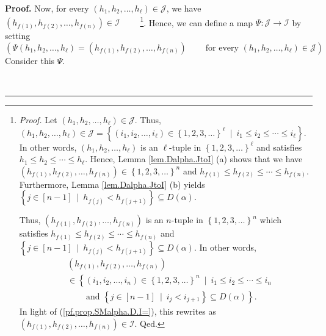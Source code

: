 \documentclass[numbers=enddot,12pt,final,onecolumn,notitlepage,abstracton]{scrartcl}
\theoremstyle{definition}
\newenvironment{proof}[1][Proof]{\noindent\textbf{#1.} }{\ \rule{0.5em}{0.5em}}
\newenvironment{verlong}{}{}
\begin{document}
\begin{verlong}
\begin{footnotesize}
\begin{proof}
Now, for every $\left(  h_{1},h_{2},\ldots,h_{\ell}\right)  \in\mathcal{J}$,
we have $\left(  h_{f\left(  1\right)  },h_{f\left(  2\right)  }%
,\ldots,h_{f\left(  n\right)  }\right)  \in\mathcal{I}$%
\ \ \ \ \footnote{\textit{Proof.} Let $\left(  h_{1},h_{2},\ldots,h_{\ell
}\right)  \in\mathcal{J}$. Thus, $\left(  h_{1},h_{2},\ldots,h_{\ell}\right)
\in\mathcal{J}=\left\{  \left(  i_{1},i_{2},\ldots,i_{\ell}\right)
\in\left\{  1,2,3,\ldots\right\}  ^{\ell}\ \mid\ i_{1}\leq i_{2}\leq\cdots\leq
i_{\ell}\right\}  $. In other words, $\left(  h_{1},h_{2},\ldots,h_{\ell
}\right)  $ is an $\ell$-tuple in $\left\{  1,2,3,\ldots\right\}  ^{\ell}$ and
satisfies $h_{1}\leq h_{2}\leq\cdots\leq h_{\ell}$. Hence, Lemma
\ref{lem.Dalpha.JtoI} (a) shows that we have $\left(  h_{f\left(  1\right)
},h_{f\left(  2\right)  },\ldots,h_{f\left(  n\right)  }\right)  \in\left\{
1,2,3,\ldots\right\}  ^{n}$ and $h_{f\left(  1\right)  }\leq h_{f\left(
2\right)  }\leq\cdots\leq h_{f\left(  n\right)  }$. Furthermore, Lemma
\ref{lem.Dalpha.JtoI} (b) yields $\left\{  j\in\left[  n-1\right]
\ \mid\ h_{f\left(  j\right)  }<h_{f\left(  j+1\right)  }\right\}  \subseteq
D\left(  \alpha\right)  $.
\par
Thus, $\left(  h_{f\left(  1\right)  },h_{f\left(  2\right)  },\ldots
,h_{f\left(  n\right)  }\right)  $ is an $n$-tuple in $\left\{  1,2,3,\ldots
\right\}  ^{n}$ which satisfies $h_{f\left(  1\right)  }\leq h_{f\left(
2\right)  }\leq\cdots\leq h_{f\left(  n\right)  }$ and $\left\{  j\in\left[
n-1\right]  \ \mid\ h_{f\left(  j\right)  }<h_{f\left(  j+1\right)  }\right\}
\subseteq D\left(  \alpha\right)  $. In other words,%
\begin{align*}
&  \left(  h_{f\left(  1\right)  },h_{f\left(  2\right)  },\ldots,h_{f\left(
n\right)  }\right) \\
&  \in\left\{  \left(  i_{1},i_{2},\ldots,i_{n}\right)  \in\left\{
1,2,3,\ldots\right\}  ^{n}\ \mid\ i_{1}\leq i_{2}\leq\cdots\leq i_{n}\right.
\\
&  \ \ \ \ \ \ \ \ \ \ \left.  \text{and }\left\{  j\in\left[  n-1\right]
\ \mid\ i_{j}<i_{j+1}\right\}  \subseteq D\left(  \alpha\right)  \right\}  .
\end{align*}
In light of (\ref{pf.prop.SMalpha.D.I=}), this rewrites as $\left(
h_{f\left(  1\right)  },h_{f\left(  2\right)  },\ldots,h_{f\left(  n\right)
}\right)  \in\mathcal{I}$. Qed.}. Hence, we can define a map $\Psi
:\mathcal{J}\rightarrow\mathcal{I}$ by setting%
\[
\left(  \Psi\left(  h_{1},h_{2},\ldots,h_{\ell}\right)  =\left(  h_{f\left(
1\right)  },h_{f\left(  2\right)  },\ldots,h_{f\left(  n\right)  }\right)
\ \ \ \ \ \ \ \ \ \ \text{for every }\left(  h_{1},h_{2},\ldots,h_{\ell
}\right)  \in\mathcal{J}\right)  .
\]
Consider this $\Psi$.


\end{proof}
\end{footnotesize}
\end{verlong}
\end{document}
